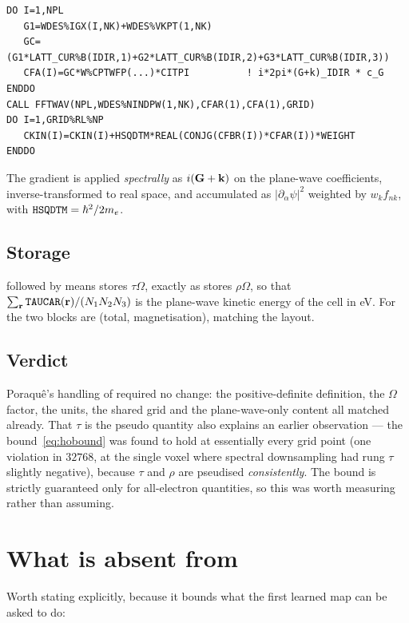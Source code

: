 \begin{lstlisting}[style=fortran]
DO I=1,NPL
   G1=WDES%IGX(I,NK)+WDES%VKPT(1,NK)
   GC=(G1*LATT_CUR%B(IDIR,1)+G2*LATT_CUR%B(IDIR,2)+G3*LATT_CUR%B(IDIR,3))
   CFA(I)=GC*W%CPTWFP(...)*CITPI          ! i*2pi*(G+k)_IDIR * c_G
ENDDO
CALL FFTWAV(NPL,WDES%NINDPW(1,NK),CFAR(1),CFA(1),GRID)
DO I=1,GRID%RL%NP
   CKIN(I)=CKIN(I)+HSQDTM*REAL(CONJG(CFBR(I))*CFAR(I))*WEIGHT
ENDDO
\end{lstlisting}

The gradient is applied \emph{spectrally} as $i(\mathbf{G}+\mathbf{k})$ on the plane-wave
coefficients, inverse-transformed to real space, and accumulated as
$|\partial_\alpha\psi|^2$ weighted by $w_k f_{nk}$, with
$\texttt{HSQDTM}=\hbar^2/2m_e$.

\subsection{Storage}

 followed by  means
 stores $\tau\Omega$, exactly as  stores $\rho\Omega$,
so that $\sum_{\mathbf{r}} \texttt{TAUCAR}(\mathbf{r})/(N_1N_2N_3)$ is the plane-wave kinetic
energy of the cell in eV. For  the two blocks are (total,
magnetisation), matching the  layout.

\subsection{Verdict}

Poraqu\^e's handling of  required no change: the positive-definite
definition, the $\Omega$ factor, the units, the shared grid and the
plane-wave-only content all matched already. That $\tau$ is the pseudo quantity
also explains an earlier observation --- the bound~\eqref{eq:hobound} was found
to hold at essentially every grid point (one violation in $32768$, at the single
voxel where spectral downsampling had rung $\tau$ slightly negative), because
$\tau$ and $\rho$ are pseudised \emph{consistently}. The bound is strictly
guaranteed only for all-electron quantities, so this was worth measuring rather
than assuming.

\section{What is absent from \texorpdfstring{}{EXTCAR}}

Worth stating explicitly, because it bounds what the first learned map can be
asked to do:

